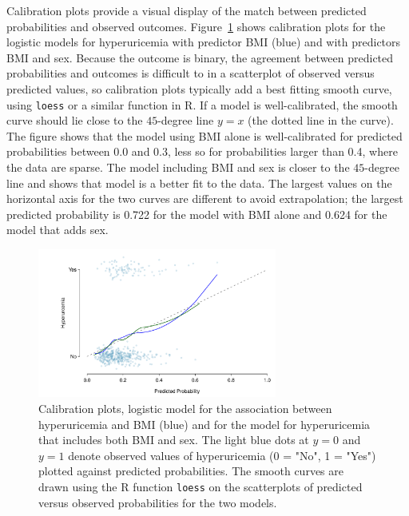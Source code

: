 Calibration plots provide a visual display of the match between predicted probabilities and observed outcomes.  Figure~\ref{figure:calibrationHuBMISex} shows calibration plots for the logistic models for hyperuricemia with predictor BMI (blue) and with predictors BMI and sex.  Because the outcome is binary, the agreement between predicted probabilities and outcomes is difficult to in a scatterplot of observed versus predicted values, so calibration plots typically add a best fitting smooth curve, using \texttt{loess} or a similar function in \textsf{R}.  If a model is well-calibrated, the smooth curve should lie close to the $45$-degree line $y = x$ (the dotted line in the curve).  The figure shows that the model using BMI alone is well-calibrated for predicted probabilities between 0.0 and 0.3, less so for probabilities larger than 0.4, where the data are sparse.  The model including BMI and sex is closer to the $45$-degree line and shows that model is a better fit to the data.  The largest values on the horizontal axis for the two curves are different to avoid extrapolation; the largest predicted probability is 0.722 for the model with BMI alone and 0.624 for the model that adds sex.

\begin{figure}[!tbh]
  \centering
  \includegraphics[width=0.70\textwidth]
  {ch_logistic_regression_oi_biostat/figures/calibrationHuBMISex/calibrationHuBMISex.pdf}
    \caption{Calibration plots, logistic model for the association between hyperuricemia and BMI (blue) and for the model for hyperuricemia that includes both BMI and sex. The light blue dots at  $y = 0$ and $y = 1$ denote observed values of hyperuricemia (0 = "No", 1 = "Yes") plotted against predicted probabilities.   The smooth curves are drawn using the \textsf{R} function \texttt{loess} on the scatterplots of predicted versus observed probabilities for the two models.}
   \label{figure:calibrationHuBMISex}
\end{figure}

